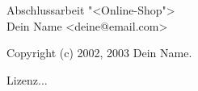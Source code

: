 %
%

\begin{titlepage}
	\vspace*{7cm}
	\begin{center}
		\Huge
		Abschlussarbeit "<Online-Shop">\\
		\vspace{2cm}
		Dein Name <deine@email.com>\\
	\end{center}
	\normalsize
	\vfill
	Copyright (c)  2002, 2003  Dein Name.

	Lizenz...	
\end{titlepage}

\tableofcontents

\listoffigures

\listoftables

%
%